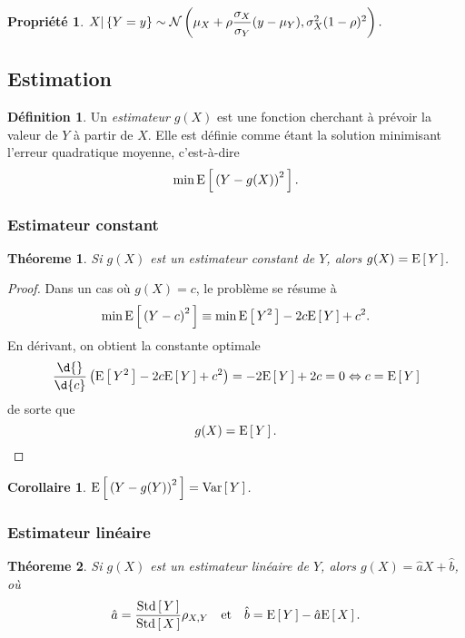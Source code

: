 \documentclass[11pt]{article}
\makeatletter
\newcommand\Norm[2]{%
	\ensuremath{%
		\mathcal{N}\left(#1,#2\right)%
	}%
}%
\newcommand\Esp[1]{%
	\ensuremath{%
		\mathrm{E}\left[\,#1\,\right]%
	}%
}%
\newcommand\Var[1]{%
	\ensuremath{%
		\mathrm{Var}\left[\,#1\,\right]%
	}%
}%
\newcommand\Std[1]{%
	\ensuremath{%
		\mathrm{Std}\left[\,#1\,\right]%
	}%
}%
\newcommand\Min{%
	\ensuremath{%
		\mathrm{min}\,%
	}%
}%
\newtheorem{theoreme}{Théoreme}[section]
\newtheorem{property}{Propriété}
\newtheorem*{corollary}{Corollaire}
\theoremstyle{remark}
\theoremstyle{definition}
\newtheorem*{@definition}{Définition}
\newenvironment{definition}{%
	\begin{@definition}%
}{%
	\end{@definition}%
	\setcounter{property}{0}%
}
\makeatother
\begin{document}
\begin{property}
	$X|\left\{Y=y\right\}\sim\Norm
	{\mu_X+\rho\dfrac{\sigma_X}{\sigma_Y}(y-\mu_Y)}
	{\sigma_X^2(1-\rho)^2}.$
\end{property}

\subsection{Estimation}
\begin{definition}
	Un \textit{estimateur} $g(X)$ est une fonction cherchant à prévoir la
	valeur de $Y$ à partir de $X$. Elle est définie comme étant la solution
	minimisant l'erreur quadratique moyenne, c'est-à-dire
	\begin{equation*}
		\Min\Esp{\left(Y-g(X)\right)^2}.
	\end{equation*}
\end{definition}

\subsubsection{Estimateur constant}
\begin{theoreme}
	Si $g(X)$ est un estimateur constant de $Y$, alors $g(X)=\Esp{Y}$.
\end{theoreme}

\begin{proof}
	Dans un cas où $g(X)=c$, le problème se résume à
	\begin{equation*}
		\Min\Esp{\left(Y-c\right)^2}\equiv
		\Min\Esp{Y^2}-2c\Esp{Y}+c^2.
	\end{equation*}
	En dérivant, on obtient la constante optimale
	\begin{equation*}
		\frac{\d{}}{\d{c}}\left(\Esp{Y^2}-2c\Esp{Y}+c^2\right)
		=-2\Esp{Y}+2c=0
		\Leftrightarrow c=\Esp{Y}
	\end{equation*}
	de sorte que
	\begin{equation*}
		g(X)=\Esp{Y}.\qedhere
	\end{equation*}
\end{proof}

\begin{corollary}
	$\Esp{\left(Y-g(Y)\right)^2}=\Var{Y}$.
\end{corollary}

\subsubsection{Estimateur linéaire}
\begin{theoreme}
	Si $g(X)$ est un estimateur linéaire de $Y$, alors $g(X)=\hat{a}X+\hat{b}$,
	où
	\begin{equation*}
		\hat{a}=\frac{\Std{Y}}{\Std{X}}\rho_{X,Y}
		\quad\text{et}\quad
		\hat{b}=\Esp{Y}-\hat{a}\Esp{X}.
	\end{equation*}
\end{theoreme}
\end{document}
